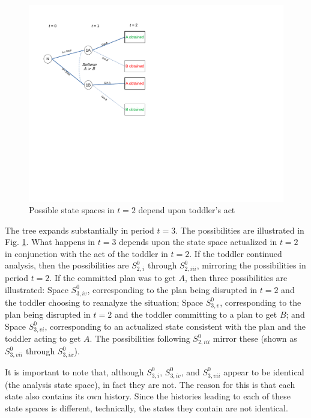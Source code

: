 \documentclass[
11pt,
titlepage,
reqno,
]{article}%
\theoremstyle{definition}
\begin{document}
\begin{figure}[h!]
	\centering
	\includegraphics*[page=17,trim = 0in 0in 0in 0in,scale=.65]{Awareness_Diagrams_All}
	\caption{Possible state spaces in $t=2$ depend upon toddler's act\label{Diag: p-17}}%
\end{figure}

The tree expands substantially in period $t=3$. The possibilities are illustrated in Fig. \ref{Diag: p-17}. What happens in $t=3$ depends upon the state space actualized in $t=2$ in conjunction with the act of the toddler in $t=2$. If the toddler continued analysis, then the possibilities are $S^0_{2,i}$ through $S^0_{2,iii}$, mirroring the possibilities in period $t=2$. If the committed plan was to get $A$, then three possibilities are illustrated: Space $S^0_{3,iv}$, corresponding to the plan being disrupted in $t=2$ and the toddler choosing to reanalyze the situation; Space $S^0_{3,v}$, corresponding to the plan being disrupted in $t=2$ and the toddler committing to a plan to get $B$; and Space $S^0_{3,vi}$, corresponding to an actualized state consistent with the plan and the toddler acting to get $A$. The possibilities following $S^0_{2,iii}$ mirror these (shown as $S^0_{3,vii}$ through $S^0_{3,ix}$).

It is important to note that, although $S^0_{3,i}$, $S^0_{3,iv}$, and $S^0_{3,vii}$ appear to be identical (the analysis state space), in fact they are not. The reason for this is that each state also contains its own history. Since the histories leading to each of these state spaces is different, technically, the states they contain are not identical.
\end{document}
